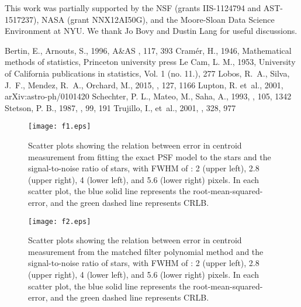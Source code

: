 \documentclass[12pt, preprint]{aastex}
\newcommand{\etal}{et~al.}
\begin{document}
This work was partially supported by the NSF (grants IIS-1124794 and AST-1517237), NASA (grant NNX12AI50G), 
and the Moore-Sloan Data Science Environment at NYU. We thank Jo Bovy and Dustin Lang for useful discussions.

\begin{thebibliography}{70}

 Bertin, E., Arnouts, S., 1996,  A\&AS , 117, 393
 Cram\'{e}r, H., 1946, Mathematical methods of statistics, Princeton university press
 Le Cam, L. M., 1953, University of California publications in statistics, Vol. 1 (no. 11.), 277
\bibitem[Lobos \etal (2015)]{lobos} Lobos, R.~A., Silva, J.~F., Mendez, R.~A., Orchard, M., 2015, \pasp , 127, 1166
\bibitem[Lupton \etal (2001)]{sdss} Lupton, R. \etal, 2001,  arXiv:astro-ph/0101420
\bibitem[Schechter \etal (1993)]{dophot} Schechter, P. L., Mateo, M., Saha, A., 1993, \pasp , 105, 1342
 Stetson, P. B., 1987, \pasp , 99, 191
 Trujillo, I., \etal, 2001, \mnras , 328, 977

\end{thebibliography}

\clearpage

\begin{figure}[!htb]
  \texttt{[image: f1.eps]}
\endminipage
\caption{Scatter plots showing the relation between error in centroid measurement
from fitting the exact PSF model to the stars and the signal-to-noise ratio of stars,
with FWHM of : 2 (upper left), 2.8 (upper right), 4 (lower left), and 5.6 (lower right)
pixels. In each scatter plot, the blue solid line represents the root-mean-squared-error, and the green dashed line represents CRLB.}\label{1}
\end{figure}

\begin{figure}[!htb]
  \texttt{[image: f2.eps]}
\endminipage
\caption{Scatter plots showing the relation between error in centroid
measurement from the matched filter polynomial method and the signal-to-noise
ratio of stars, with FWHM of : 2 (upper left), 2.8 (upper right), 4 (lower left),
and 5.6 (lower right) pixels. In each scatter plot, the blue solid line represents the root-mean-squared-error, and the green dashed line represents CRLB.}\label{2}
\end{figure}
\end{document}
